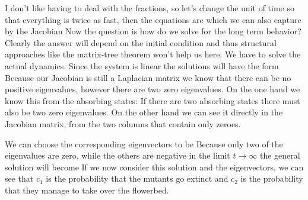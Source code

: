 I don't like having to deal with the fractions, so let's change the unit of time so that everything is twice as fast, then the equations are
which we can also capture by the Jacobian
Now the question is how do we solve for the long term behavior? Clearly the answer will depend on the initial condition and thus structural approaches like the matrix-tree theorem won't help us here. We have to solve the actual dynamics. Since the system is linear the solutions will have the form
Because our Jacobian is still a Laplacian matrix we know that there can be no positive eigenvalues, however there are two zero eigenvalues. On the one hand we know this from the absorbing states: If there are two absorbing states there must also be two zero eigenvalues. On the other hand we can see it directly in the Jacobian matrix, from the two columns that contain only zeroes.

We can choose the corresponding eigenvectors to be
Because only two of the eigenvalues are zero, while the others are negative in the limit $t\to \infty$ the general solution will become 
If we now consider this solution and the eigenvectors, we can see that $c_1$ is the probability that the mutants go extinct and $c_2$ is the probability that they manage to take over the flowerbed. 

